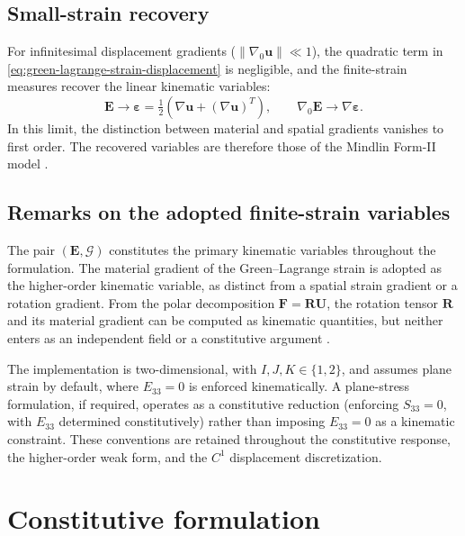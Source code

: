 \documentclass[preprint,12pt]{elsarticle}
\begin{document}
\subsection{Small-strain recovery}
\label{sec:small-strain-recovery}

For infinitesimal displacement gradients ($\|\nabla_0\mathbf{u}\|\ll 1$), the
quadratic term in \eqref{eq:green-lagrange-strain-displacement} is negligible,
and the finite-strain measures recover the linear kinematic variables:
\begin{equation}
 \mathbf{E}\longrightarrow\boldsymbol{\varepsilon}
 =\tfrac{1}{2}\left(\nabla\mathbf{u}+(\nabla\mathbf{u})^{T}\right),
 \qquad
 \nabla_0\mathbf{E}\longrightarrow\nabla\boldsymbol{\varepsilon}.
 \label{eq:kinematic-small-strain-recovery}
\end{equation}
In this limit, the distinction between material and spatial gradients
vanishes to first order. The recovered variables are therefore those of the
Mindlin Form-II model \cite{MindlinEshel1968}.

\subsection{Remarks on the adopted finite-strain variables}
\label{sec:remarks-finite-strain-variables}

The pair $(\mathbf{E},\bm{\mathcal{G}})$ constitutes the primary kinematic
variables throughout the formulation. The material gradient of the
Green--Lagrange strain is adopted as the higher-order kinematic variable,
as distinct from a spatial strain gradient or a rotation gradient. From the
polar decomposition $\mathbf{F}=\mathbf{R}\mathbf{U}$, the rotation tensor
$\mathbf{R}$ and its material gradient can be computed as kinematic
quantities, but neither enters as an independent field or a constitutive
argument \cite{Holzapfel2000,Ogden1997}.

The implementation is two-dimensional, with $I,J,K\in\{1,2\}$, and assumes
plane strain by default, where $E_{33}=0$ is enforced kinematically. A
plane-stress formulation, if required, operates as a constitutive reduction
(enforcing $S_{33}=0$, with $E_{33}$ determined constitutively) rather than
imposing $E_{33}=0$ as a kinematic constraint. These conventions are
retained throughout the constitutive response, the higher-order weak form,
and the $C^1$ displacement discretization.

\section{Constitutive formulation}
\label{sec:constitutive}
\end{document}
